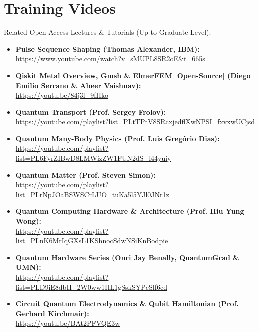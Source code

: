 \chapter{\LARGE Training Videos}

\begin{flushleft}
\large Related Open Access Lectures \& Tutorials (Up to Graduate-Level):
\end{flushleft}

\normalsize\begin{itemize}

  \item\textbf{Pulse Sequence Shaping (Thomas Alexander, IBM):}\\
\url{https://www.youtube.com/watch?v=sMUPL8SR2oE&t=665s}

  \item\textbf{Qiskit Metal Overview, Gmsh \& ElmerFEM [Open-Source] (Diego Emilio Serrano \& Abeer Vaishnav):}\\
\url{https://youtu.be/84j3l_9fHko}

  \item\textbf{Quantum Transport (Prof. Sergey Frolov):}\\
\url{https://youtube.com/playlist?list=PLtTPtV8SRcxjedflXwNPSI_fxvxwUCjsd}

  \item\textbf{Quantum Many-Body Physics (Prof. Luis Gregório Dias):}\\
\url{https://youtube.com/playlist?list=PL6FyrZIBwD8LMWizZW1FUN2dS_l44yuiy}

  \item\textbf{Quantum Matter (Prof. Steven Simon):}\\
\url{https://youtube.com/playlist?list=PLrNpJOaBSWSCrLUO_tuKa5l5YJl0JNr1z}

  \item\textbf{Quantum Computing Hardware \& Architecture (Prof. Hiu Yung Wong):}\\
\url{https://youtube.com/playlist?list=PLnK6MrIqGXsL1KShnocSdwNSiKnBodpie}

  \item\textbf{Quantum Hardware Series (Onri Jay Benally, QuantumGrad \& UMN):}\\
\url{https://youtube.com/playlist?list=PLD9iE8dbH_2W0ww1HL1gSskSYPcSlf6cd}

  \item\textbf{Circuit Quantum Electrodynamics \& Qubit Hamiltonian (Prof. Gerhard Kirchmair):}\\
\url{https://youtu.be/BAt2PFVQE3w}


\end{itemize}
